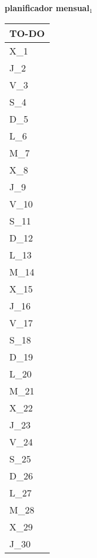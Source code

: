 \clearpage
\raggedright{
	\fontsize{25}{50}\selectfont
	\textbf{\NextYear}
}\scriptsize{\textbf{planificador mensual$_1$}}\\[11.3pt]



	\noindent\dotfill
	\renewcommand{\arraystretch}{1.5}\scriptsize
		\begin{longtabu} to \textwidth { X[l]}
		\centering \small{\textbf{TO-DO}} \\
		\toprule
		X_{1} \dotfill\\
		J_{2} \dotfill\\
		V_{3} \dotfill\\
		S_{4} \dotfill\\
		D_{5} \dotfill\\
		\hline
		L_{6} \dotfill\\
		M_{7} \dotfill\\
		X_{8} \dotfill\\
		J_{9} \dotfill\\
		V_{10} \dotfill\\
		S_{11} \dotfill\\
		D_{12} \dotfill\\
		\hline
		L_{13} \dotfill\\
		M_{14} \dotfill\\
		X_{15} \dotfill\\
		J_{16} \dotfill\\
		V_{17} \dotfill\\
		S_{18} \dotfill\\
		D_{19} \dotfill\\
		\hline
		L_{20} \dotfill\\
		M_{21} \dotfill\\
		X_{22} \dotfill\\
		J_{23} \dotfill\\
		V_{24} \dotfill\\
		S_{25} \dotfill\\
		D_{26} \dotfill\\
		\hline
		L_{27} \dotfill\\
		M_{28} \dotfill\\
		X_{29} \dotfill\\
		J_{30} \dotfill\\

		\bottomrule

	\end{longtabu}


\clearpage

